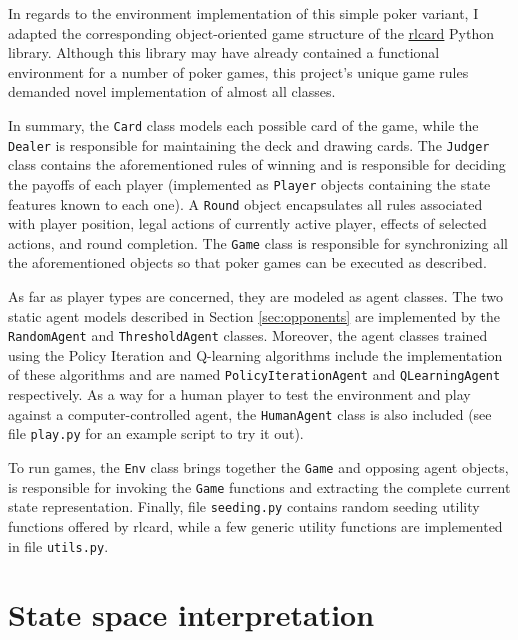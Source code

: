 \begin{appendices}
In regards to the environment implementation of this simple poker variant, I adapted the corresponding object-oriented game structure of the \href{https://rlcard.org/}{rlcard} Python library. Although this library may have already contained a functional environment for a number of poker games, this project's unique game rules demanded novel implementation of almost all classes.

In summary, the \Verb|Card| class models each possible card of the game, while the \Verb|Dealer| is responsible for maintaining the deck and drawing cards. The \Verb|Judger| class contains the aforementioned rules of winning and is responsible for deciding the payoffs of each player (implemented as \Verb|Player| objects containing the state features known to each one). A \Verb|Round| object encapsulates all rules associated with player position, legal actions of currently active player, effects of selected actions, and round completion. The \Verb|Game| class is responsible for synchronizing all the aforementioned objects so that poker games can be executed as described.

As far as player types are concerned, they are modeled as agent classes. The two static agent models described in Section \ref{sec:opponents} are implemented by the \Verb|RandomAgent| and \Verb|ThresholdAgent| classes. Moreover, the agent classes trained using the Policy Iteration and Q-learning algorithms include the implementation of these algorithms and are named \Verb|PolicyIterationAgent| and \Verb|QLearningAgent| respectively. As a way for a human player to test the environment and play against a computer-controlled agent, the \Verb|HumanAgent| class is also included (see file \Verb|play.py| for an example script to try it out).

To run games, the \Verb|Env| class brings together the \Verb|Game| and opposing agent objects, is responsible for invoking the \Verb|Game| functions and extracting the complete current state representation. Finally, file \Verb|seeding.py| contains random seeding utility functions offered by rlcard, while a few generic utility functions are implemented in file \Verb|utils.py|.

\section{State space interpretation}
\label{app:states}


\end{appendices}
